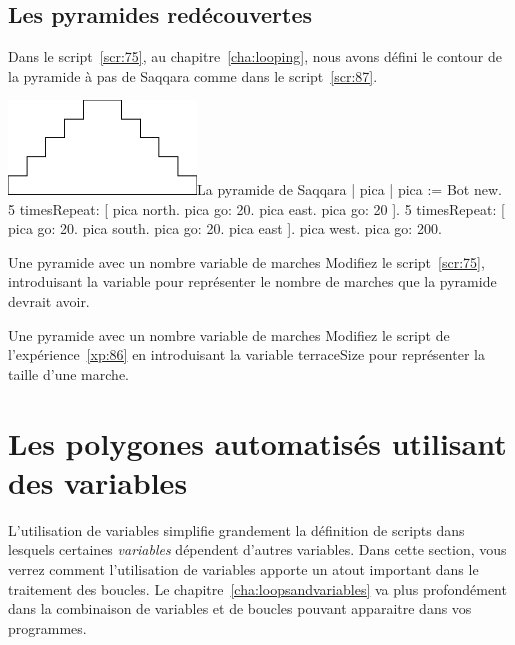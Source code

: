 \documentclass[a4paper,10pt,twoside]{book}
\begin{document}
\subsection{Les pyramides red\'ecouvertes}

Dans le script~\ref{scr:75}, au chapitre~\ref{cha:looping}, nous avons d\'efini le contour de la pyramide \`a pas de Saqqara comme dans le script~\ref{scr:87}.

\begin{scriptfigwithsize}[0.4]{\includegraphics[width=5cm]{varPyramid}}{La pyramide de Saqqara}\label{scr:87}
| pica | 
pica := Bot new. 
5 timesRepeat: 
[ pica north. 
pica go: 20. 
pica east. 
pica go: 20 ]. 
5 timesRepeat: 
[ pica go: 20. 
pica south. 
pica go: 20. 
pica east ]. 
pica west. 
pica go: 200.	
\end{scriptfigwithsize}


\begin{exonofigtitle}{Une pyramide avec un nombre variable de marches}\label{xp:86}
Modifiez le script~\ref{scr:75}, introduisant la variable  pour repr\'esenter le nombre de marches que la pyramide devrait avoir.
\end{exonofigtitle}


\begin{exonofigtitle}{Une pyramide avec un nombre variable de marches}
Modifiez le script de l'exp\'erience~\ref{xp:86} en introduisant la variable terraceSize pour repr\'esenter la taille d'une marche.
\end{exonofigtitle}


\section{Les polygones automatis\'es utilisant des variables }

L'utilisation de variables simplifie grandement la d\'efinition de scripts dans lesquels certaines \emph{variables} d\'ependent d'autres variables. Dans cette section, vous verrez comment l'utilisation de variables apporte un atout important dans le traitement des boucles. Le chapitre~\ref{cha:loopsandvariables} va plus profond\'ement dans la combinaison de variables et de boucles pouvant apparaitre dans vos programmes. 
\end{document}
